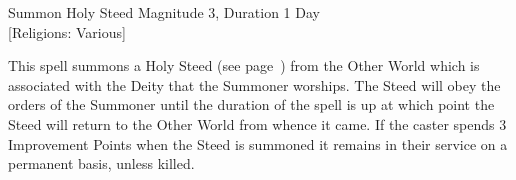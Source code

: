 \begin{rpg-spell}
{Summon Holy Steed}
{Magnitude 3, Duration 1 Day\\{[Religions: Various]}}

This spell summons a Holy Steed (see page~\pageref{monster:holy-steed}) from the Other World which is associated with the Deity that the Summoner worships. The Steed will obey the orders of the Summoner until the duration of the spell is up at which point the Steed will return to the Other World from whence it came. If the caster spends 3 Improvement Points when the Steed is summoned it remains in their service on a permanent basis, unless killed.
\end{rpg-spell}

